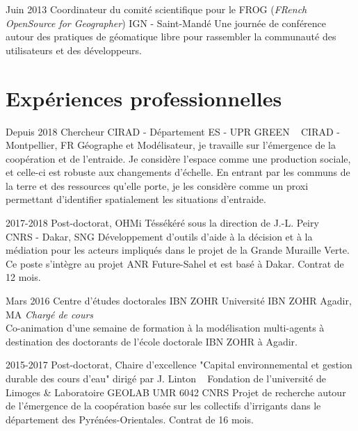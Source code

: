 \documentclass[]{cv-etienne}
\begin{document}
\begin{entrylist}
  \entry
  {Juin 2013}
  {Coordinateur du comité scientifique pour le FROG  (\emph{FRench OpenSource for Geographer})}
  {IGN - Saint-Mandé}
  {Une journée de conférence autour des pratiques de géomatique libre pour rassembler la communauté des utilisateurs et des développeurs.}
\end{entrylist}

\section{Expériences professionnelles}
\begin{entrylist}
  \entry
  {Depuis 2018}
  {Chercheur CIRAD - Département ES - UPR GREEN ~}
  {CIRAD - Montpellier, FR}
  {Géographe et Modélisateur, je travaille sur l'émergence de la coopération et de l'entraide. Je considère l'espace comme une production sociale, et celle-ci est robuste aux changements d'échelle. En entrant par les communs de la terre et des ressources qu'elle porte, je les considère comme un proxi permettant d'identifier spatialement les situations d'entraide.}
\end{entrylist}
\begin{entrylist}
  \entry
  {2017-2018}
  {Post-doctorat, OHMi Téssékéré  {\normalfont sous la direction de J.-L. Peiry} ~}
  {CNRS - Dakar, SNG}
  {Développement d'outils d'aide à la décision et à la médiation pour les acteurs impliqués dans le projet de la Grande Muraille Verte. Ce poste s'intègre au projet ANR Future-Sahel et est basé à Dakar. Contrat de 12 mois.}
\end{entrylist}
\begin{entrylist}
  \entry
  {Mars 2016}
  {Centre d'études doctorales IBN ZOHR}
  {Université IBN ZOHR Agadir, MA}
  {\emph{Chargé de cours} \\
  Co-animation d'une semaine de formation à la modélisation multi-agents à destination des doctorants de l'école doctorale IBN ZOHR à Agadir.
  }
\end{entrylist}
\begin{entrylist}
  \entry
  {2015-2017}
  {Post-doctorat, Chaire d'excellence "Capital environnemental et gestion durable des cours d'eau"  {\normalfont dirigé par J. Linton} ~}
  {Fondation de l'université de Limoges \& Laboratoire GEOLAB UMR 6042 CNRS}
  {Projet de recherche autour de l'émergence de la coopération basée sur les collectifs d'irrigants dans le département des Pyrénées-Orientales. Contrat de 16 mois.}
\end{entrylist}
\end{document}
